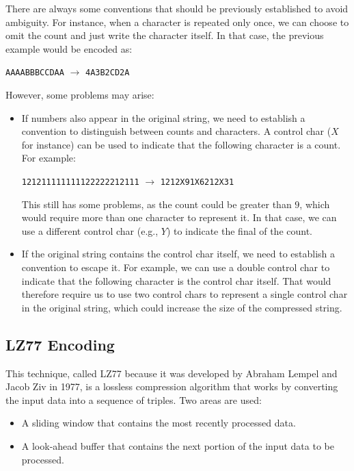 There are always some conventions that should be previously established to avoid ambiguity. For instance, when a character is repeated only once, we can choose to omit the count and just write the character itself. In that case, the previous example would be encoded as:
\begin{center}
    \texttt{AAAABBBCCDAA} $\rightarrow$ \texttt{4A3B2CD2A}
\end{center}

However, some problems may arise:
\begin{itemize}
    \item If numbers also appear in the original string, we need to establish a convention to distinguish between counts and characters. A control char ($X$ for instance) can be used to indicate that the following character is a count. For example:
\begin{center}
    \texttt{121211111111122222212111} $\rightarrow$ \texttt{1212X91X6212X31}
\end{center}
    This still has some problems, as the count could be greater than $9$, which would require more than one character to represent it. In that case, we can use a different control char (e.g., $Y$) to indicate the final of the count.

    \item If the original string contains the control char itself, we need to establish a convention to escape it. For example, we can use a double control char to indicate that the following character is the control char itself. That would therefore require us to use two control chars to represent a single control char in the original string, which could increase the size of the compressed string.
\end{itemize}


\subsection{LZ77 Encoding}

This technique, called LZ77 because it was developed by Abraham Lempel and Jacob Ziv in 1977, is a lossless compression algorithm that works by converting the input data into a sequence of triples. Two areas are used:
\begin{itemize}
    \item A sliding window that contains the most recently processed data.
    \item A look-ahead buffer that contains the next portion of the input data to be processed.
\end{itemize}

